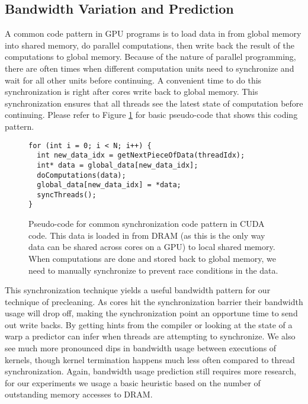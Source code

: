 \subsection{Bandwidth Variation and Prediction}
A common code pattern in GPU programs is to load data in from global memory into shared memory, do parallel computations, then write back the result of the computations to global memory. Because of the nature of parallel programming, there are often times when different computation units need to synchronize and wait for all other units before continuing. A convenient time to do this synchronization is right after cores write back to global memory. This synchronization ensures that all threads see the latest state of computation before continuing. Please refer to Figure \ref{f:cuda_sync} for basic pseudo-code that shows this coding pattern.

\begin{figure}[htb]
\begin{center}

\begin{lstlisting}
for (int i = 0; i < N; i++) {
  int new_data_idx = getNextPieceOfData(threadIdx);
  int* data = global_data[new_data_idx];
  doComputations(data);
  global_data[new_data_idx] = *data;
  syncThreads();
}
\end{lstlisting}
\caption{Pseudo-code for common synchronization code pattern in CUDA code. This data is loaded in from DRAM (as this is the only way data can be shared across cores on a GPU) to local shared memory. When computations are done and stored back to global memory, we need to manually synchronize to prevent race conditions in the data.}
\label{f:cuda_sync}
\end{center}
\end{figure}
%


This synchronization technique yields a useful bandwidth pattern for our technique of precleaning. As cores hit the synchronization barrier their bandwidth usage will drop off, making the synchronization point an opportune time to send out write backs. By getting hints from the compiler or looking at the state of a warp a predictor can infer when threads are attempting to synchronize. We also see much more pronounced dips in bandwidth usage between executions of kernels, though kernel termination happens much less often compared to thread synchronization. Again, bandwidth usage prediction still requires more research, for our experiments we usage a basic heuristic based on the number of outstanding memory accesses to DRAM.
